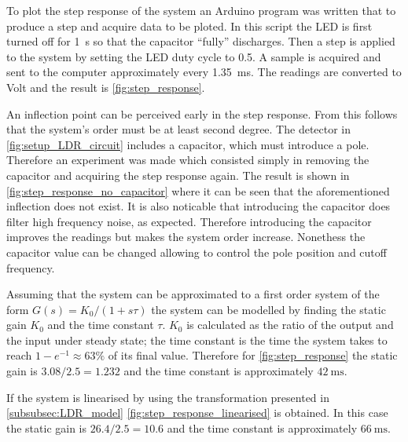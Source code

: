 To plot the step response of the system an Arduino program was written that to produce a step and acquire data to be ploted. In this script the LED is first turned off for \SI{1}{\second} so that the capacitor ``fully'' discharges. Then a step is applied to the system by setting the LED duty cycle to 0.5. A sample is acquired and sent to the computer approximately every \SI{1.35}{\milli\second}. The readings are converted to Volt and the result is \autoref{fig:step_response}.

An inflection point can be perceived early in the step response. From this follows that the system's order must be at least second degree. The detector in \autoref{fig:setup_LDR_circuit} includes a capacitor, which must introduce a pole. Therefore an experiment was made which consisted simply in removing the capacitor and acquiring the step response again. The result is shown in \autoref{fig:step_response_no_capacitor} where it can be seen that the aforementioned inflection does not exist. It is also noticable that introducing the capacitor does filter high frequency noise, as expected. Therefore introducing the capacitor improves the readings but makes the system order increase. Nonethess the capacitor value can be changed allowing to control the pole position and cutoff frequency.

Assuming that the system can be approximated to a first order system of the form $G(s) = K_0/(1+s\tau)$ the system can be modelled by finding the static gain $K_0$ and the time constant $\tau$. $K_0$ is calculated as the ratio of the output and the input under steady state; the time constant is the time the system takes to reach $1-e^{-1} \approx 63 \%$ of its final value. Therefore for \autoref{fig:step_response} the static gain is $3.08/2.5 = 1.232$ and the time constant is approximately $\SI{42}{\milli\second}$.

If the system is linearised by using the transformation presented in \ref{subsubsec:LDR_model} \autoref{fig:step_response_linearised} is obtained. In this case the static gain is $26.4/2.5 = 10.6$ and the time constant is approximately $\SI{66}{\milli\second}$.

